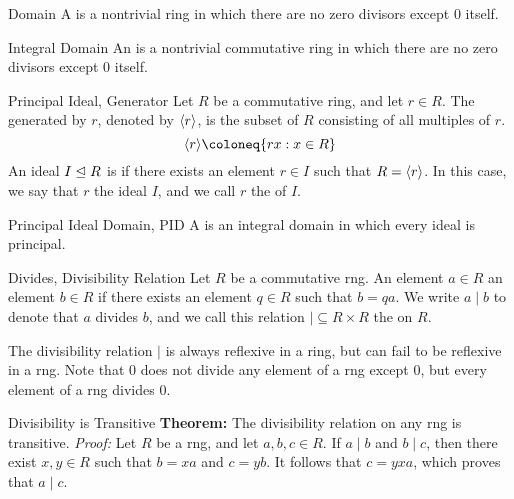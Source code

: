 \documentclass[12pt]{report}
\begin{document}
\begin{dfnbox}{Domain}
	A  is a nontrivial ring in which there are no zero divisors except $0$ itself.
\end{dfnbox}

\begin{dfnbox}{Integral Domain}
	An  is a nontrivial commutative ring in which there are no zero divisors except $0$ itself.
\end{dfnbox}

\begin{dfnbox}{Principal Ideal, Generator}
	Let $R$ be a commutative ring, and let $r \in R$. The  generated by $r$, denoted by ${\langle {r} \rangle}$, is the subset of $R$ consisting of all multiples of $r$.
	\[ \gen{r} \coloneq \{ rx : x \in R \} \]
	An ideal $I \trianglelefteq R$ is  if there exists an element $r \in I$ such that $R = {\langle {r} \rangle}$. In this case, we say that $r$  the ideal $I$, and we call $r$ the  of $I$.
\end{dfnbox}

\begin{dfnbox}{Principal Ideal Domain, PID}
	A  is an integral domain in which every ideal is principal.
\end{dfnbox}

\begin{dfnbox}{Divides, Divisibility Relation}
	Let $R$ be a commutative rng. An element $a \in R$  an element $b \in R$ if there exists an element $q \in R$ such that $b = qa$. We write $a \mid b$ to denote that $a$ divides $b$, and we call this relation ${\mid} \subseteq R \times R$ the  on $R$.
\end{dfnbox}

The divisibility relation $\mid$ is always reflexive in a ring, but can fail to be reflexive in a rng. Note that $0$ does not divide any element of a rng except $0$, but every element of a rng divides $0$.

\begin{thmbox}{Divisibility is Transitive}
	\textbf{Theorem:} The divisibility relation on any rng is transitive.
\tcblower
	\textit{Proof:} Let $R$ be a rng, and let $a, b, c \in R$. If $a \mid b$ and $b \mid c$, then there exist $x, y \in R$ such that $b = xa$ and $c = yb$. It follows that $c = yxa$, which proves that $a \mid c$.
\end{thmbox}
\end{document}
